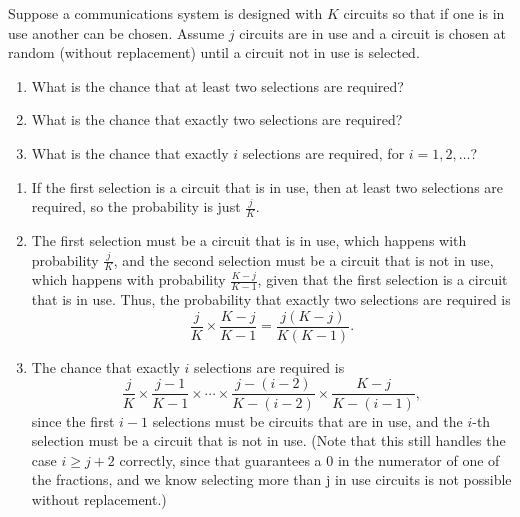 \documentclass[12pt]{article}
\newenvironment{problem}[2][Problem]{\begin{trivlist}
\item[\hskip \labelsep {\bfseries #1}\hskip \labelsep {\bfseries #2.}]}
{\end{trivlist}}
\begin{document}
\begin{problem}{6}
  Suppose a communications system is designed with $K$ circuits so that 
  if one is in use another can be chosen. Assume $j$ circuits are in use 
  and a circuit is chosen at random (without replacement) until a circuit 
  not in use is selected.
  \begin{enumerate}
    \item What is the chance that at least two selections are required?
    \item What is the chance that exactly two selections are required?
    \item What is the chance that exactly $i$ selections are required, 
    for $i = 1, 2, \dots$?
  \end{enumerate}
  \begin{enumerate}
    \item If the first selection is a circuit that is in use, then at least 
    two selections are required, so the probability is just $\frac{j}{K}$.
    \item The first selection must be a circuit that is in use,
    which happens with probability $\frac{j}{K}$, and the second selection
    must be a circuit that is not in use, which happens with probability
    $\frac{K-j}{K-1}$, given that the first selection is a circuit that is
    in use. Thus, the probability that exactly two selections are required is
    \[
      \frac{j}{K} \times \frac{K-j}{K-1} = \frac{j(K-j)}{K(K-1)}.
    \]
    \item The chance that exactly $i$ selections are required is
    \[
      \frac{j}{K} \times \frac{j-1}{K-1} \times \cdots \times
      \frac{j-(i-2)}{K-(i-2)} \times \frac{K-j}{K-(i-1)},
    \]
    since the first $i-1$ selections must be circuits that are in use,
    and the $i$-th selection must be a circuit that is not in use.
    (Note that this still handles the case $i \ge j+2$ correctly,
    since that guarantees a 0 in the numerator of one of the fractions,
    and we know selecting more than j in use circuits is not possible
    without replacement.)
  \end{enumerate}
\end{problem}
\end{document}
